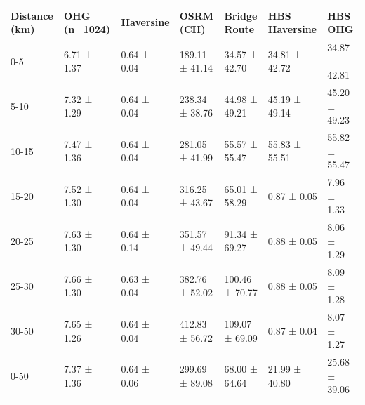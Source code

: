 \begin{tabular}{lllllll}
\toprule
Distance (km) & OHG (n=1024) & Haversine & OSRM (CH) & Bridge Route & HBS Haversine & HBS OHG \\
\midrule
0-5 & 6.71 ± 1.37 & 0.64 ± 0.04 & 189.11 ± 41.14 & 34.57 ± 42.70 & 34.81 ± 42.72 & 34.87 ± 42.81 \\
5-10 & 7.32 ± 1.29 & 0.64 ± 0.04 & 238.34 ± 38.76 & 44.98 ± 49.21 & 45.19 ± 49.14 & 45.20 ± 49.23 \\
10-15 & 7.47 ± 1.36 & 0.64 ± 0.04 & 281.05 ± 41.99 & 55.57 ± 55.47 & 55.83 ± 55.51 & 55.82 ± 55.47 \\
15-20 & 7.52 ± 1.30 & 0.64 ± 0.04 & 316.25 ± 43.67 & 65.01 ± 58.29 & 0.87 ± 0.05 & 7.96 ± 1.33 \\
20-25 & 7.63 ± 1.30 & 0.64 ± 0.14 & 351.57 ± 49.44 & 91.34 ± 69.27 & 0.88 ± 0.05 & 8.06 ± 1.29 \\
25-30 & 7.66 ± 1.30 & 0.63 ± 0.04 & 382.76 ± 52.02 & 100.46 ± 70.77 & 0.88 ± 0.05 & 8.09 ± 1.28 \\
30-50 & 7.65 ± 1.26 & 0.64 ± 0.04 & 412.83 ± 56.72 & 109.07 ± 69.09 & 0.87 ± 0.04 & 8.07 ± 1.27 \\
0-50 & 7.37 ± 1.36 & 0.64 ± 0.06 & 299.69 ± 89.08 & 68.00 ± 64.64 & 21.99 ± 40.80 & 25.68 ± 39.06 \\
\bottomrule
\end{tabular}
